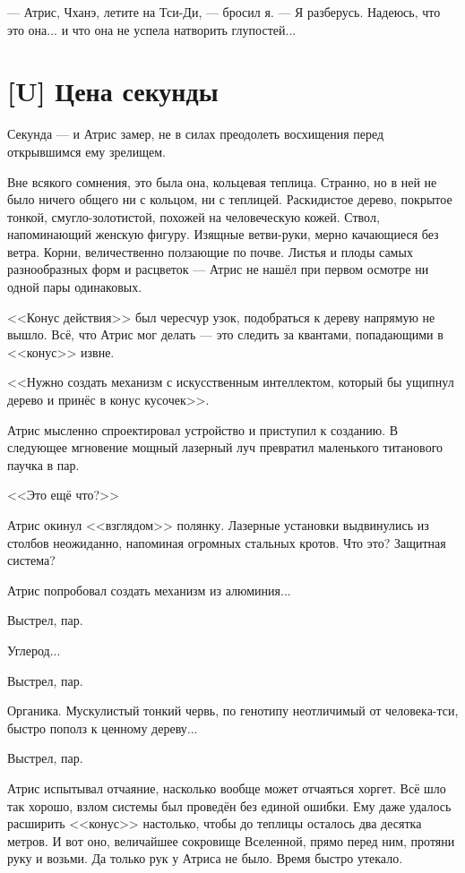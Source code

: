 --- Атрис, Чханэ, летите на Тси-Ди, --- бросил я.
--- Я разберусь.
Надеюсь, что это она... и что она не успела натворить глупостей...


\section{[U] Цена секунды}

Секунда --- и Атрис замер, не в силах преодолеть восхищения перед открывшимся ему зрелищем.

Вне всякого сомнения, это была она, кольцевая теплица.
Странно, но в ней не было ничего общего ни с кольцом, ни с теплицей.
Раскидистое дерево, покрытое тонкой, смугло-золотистой, похожей на человеческую кожей.
Ствол, напоминающий женскую фигуру.
Изящные ветви-руки, мерно качающиеся без ветра.
Корни, величественно ползающие по почве.
Листья и плоды самых разнообразных форм и расцветок --- Атрис не нашёл при первом осмотре ни одной пары одинаковых.

<<Конус действия>> был чересчур узок, подобраться к дереву напрямую не вышло.
Всё, что Атрис мог делать --- это следить за квантами, попадающими в <<конус>> извне.

<<Нужно создать механизм с искусственным интеллектом, который бы ущипнул дерево и принёс в конус кусочек>>.

Атрис мысленно спроектировал устройство и приступил к созданию.
В следующее мгновение мощный лазерный луч превратил маленького титанового паучка в пар.

<<Это ещё что?>>

Атрис окинул <<взглядом>> полянку.
Лазерные установки выдвинулись из столбов неожиданно, напоминая огромных стальных кротов.
Что это?
Защитная система?

Атрис попробовал создать механизм из алюминия...

Выстрел, пар.

Углерод...

Выстрел, пар.

Органика.
Мускулистый тонкий червь, по генотипу неотличимый от человека-тси, быстро пополз к ценному дереву...

Выстрел, пар.

Атрис испытывал отчаяние, насколько вообще может отчаяться хоргет.
Всё шло так хорошо, взлом системы был проведён без единой ошибки.
Ему даже удалось расширить <<конус>> настолько, чтобы до теплицы осталось два десятка метров.
И вот оно, величайшее сокровище Вселенной, прямо перед ним, протяни руку и возьми.
Да только рук у Атриса не было.
Время быстро утекало.

